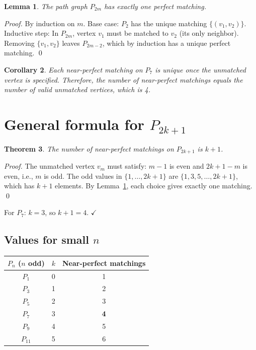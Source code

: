 \documentclass[11pt,letterpaper]{article}
\newtheorem{theorem}{Theorem}[section]
\newtheorem{lemma}[theorem]{Lemma}
\newtheorem{corollary}[theorem]{Corollary}
\numberwithin{equation}{section}
\begin{document}
\begin{lemma}
\label{lem:path_unique}
The path graph $P_{2m}$ has exactly one perfect matching.
\end{lemma}

\textit{Proof.}
By induction on $m$. Base case: $P_2$ has the unique matching $\{(v_1,v_2)\}$.
Inductive step: In $P_{2m}$, vertex $v_1$ must be matched to $v_2$ (its only
neighbor). Removing $\{v_1, v_2\}$ leaves $P_{2m-2}$, which by induction has
a unique perfect matching. \qed

\begin{corollary}
Each near-perfect matching on $P_7$ is unique once the unmatched vertex is
specified. Therefore, the number of near-perfect matchings equals the number
of valid unmatched vertices, which is 4.
\end{corollary}

\section{General formula for $P_{2k+1}$}
\label{sec:general}

\begin{theorem}
\label{thm:general}
The number of near-perfect matchings on $P_{2k+1}$ is $k+1$.
\end{theorem}

\textit{Proof.}
The unmatched vertex $v_m$ must satisfy: $m - 1$ is even and $2k + 1 - m$
is even, i.e., $m$ is odd. The odd values in $\{1, \ldots, 2k+1\}$ are
$\{1, 3, 5, \ldots, 2k+1\}$, which has $k+1$ elements. By
Lemma~\ref{lem:path_unique}, each choice gives exactly one matching. \qed

For $P_7$: $k = 3$, so $k + 1 = 4$. $\checkmark$

\subsection{Values for small $n$}

\begin{center}
\begin{tabular}{ccc}
\toprule
$P_n$ ($n$ odd) & $k$ & Near-perfect matchings \\
\midrule
$P_1$ & 0 & 1 \\
$P_3$ & 1 & 2 \\
$P_5$ & 2 & 3 \\
$P_7$ & 3 & \textbf{4} \\
$P_9$ & 4 & 5 \\
$P_{11}$ & 5 & 6 \\
\bottomrule
\end{tabular}
\end{center}
\end{document}
